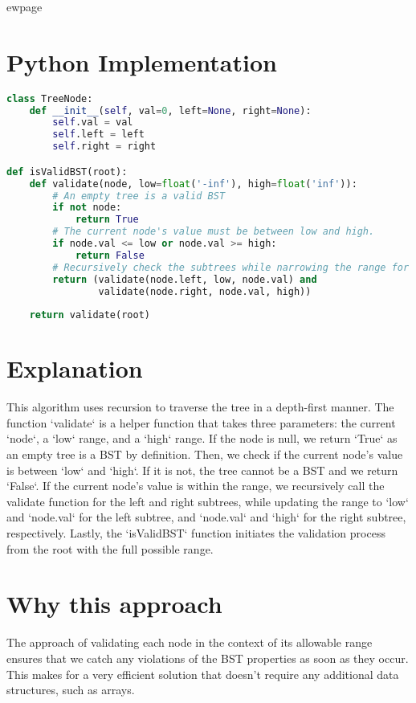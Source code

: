 ewpage

\section*{Python Implementation}

\begin{fullwidth}
\begin{lstlisting}[language=Python]
class TreeNode:
    def __init__(self, val=0, left=None, right=None):
        self.val = val
        self.left = left
        self.right = right

def isValidBST(root):
    def validate(node, low=float('-inf'), high=float('inf')):
        # An empty tree is a valid BST
        if not node:
            return True
        # The current node's value must be between low and high.
        if node.val <= low or node.val >= high:
            return False
        # Recursively check the subtrees while narrowing the range for each node
        return (validate(node.left, low, node.val) and
                validate(node.right, node.val, high))
                
    return validate(root)
\end{lstlisting}

\end{fullwidth}

\section*{Explanation}
This algorithm uses recursion to traverse the tree in a depth-first manner. The function `validate` is a helper function that takes three parameters: the current `node`, a `low` range, and a `high` range. If the node is null, we return `True` as an empty tree is a BST by definition. Then, we check if the current node's value is between `low` and `high`. If it is not, the tree cannot be a BST and we return `False`. If the current node's value is within the range, we recursively call the validate function for the left and right subtrees, while updating the range to `low` and `node.val` for the left subtree, and `node.val` and `high` for the right subtree, respectively. Lastly, the `isValidBST` function initiates the validation process from the root with the full possible range.

\section*{Why this approach}
The approach of validating each node in the context of its allowable range ensures that we catch any violations of the BST properties as soon as they occur. This makes for a very efficient solution that doesn't require any additional data structures, such as arrays.

